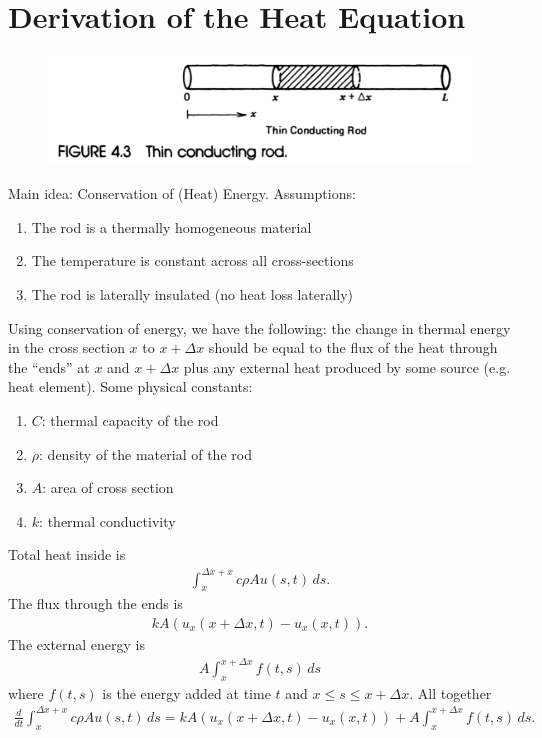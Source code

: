 \documentclass{book}
\theoremstyle{definition}
\begin{document}
\chapter{Derivation of the Heat Equation}
\begin{figure}[h!]
	\centering
	\includegraphics[scale=0.3]{heat.png}
\end{figure}
Main idea: Conservation of (Heat) Energy. Assumptions:
\begin{enumerate}
	\item The rod is a thermally homogeneous material 
	\item The temperature is constant across all cross-sections
	\item The rod is laterally insulated (no heat loss laterally)
\end{enumerate}
Using conservation of energy, we have the following: the change in thermal energy in the cross section $x$ to $x+\Delta x$ should be equal to the flux of the heat through the ``ends'' at $x$ and $x+\Delta x$ plus any external heat produced by some source (e.g. heat element). Some physical constants:
\begin{enumerate}
	\item $C$: thermal capacity of the rod
	\item $\rho$: density of the material of the rod
	\item $A$: area of cross section
	\item $k$: thermal conductivity
\end{enumerate}
Total heat inside is
\begin{align*}
\int_{x}^{\Delta x + x}c\rho A u(s,t)\,ds.
\end{align*}
The flux through the ends is
\begin{align*}
kA(u_x(x+\Delta x,t) - u_x(x, t)).
\end{align*}
The external energy is
\begin{align*}
A\int_x^{x+\Delta x}f(t,s)\,ds
\end{align*}
where $f(t,s)$ is the energy added at time $t$ and $x\leq s \leq x+\Delta x$. All together
\begin{align*}
\frac{d}{dt}\int_{x}^{\Delta x + x}c\rho A u(s,t)\,ds = kA(u_x(x+\Delta x,t) - u_x(x, t)) + A\int_x^{x+\Delta x}f(t,s)\,ds.
\end{align*}
\end{document}
